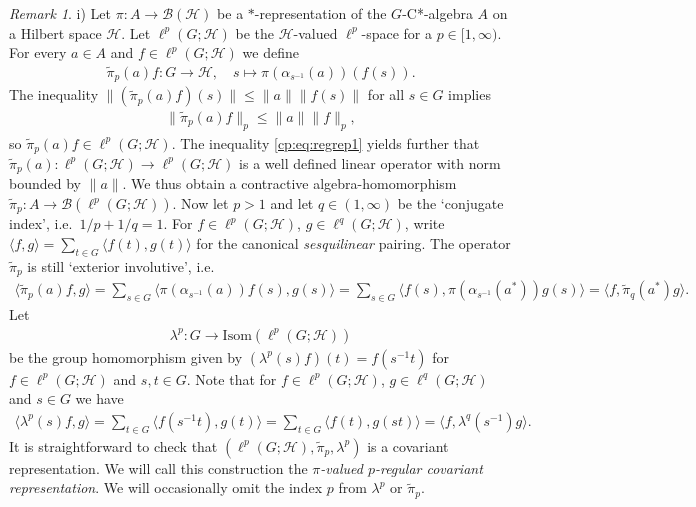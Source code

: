 \documentclass[12pt]{amsart}
\theoremstyle{definition}
\theoremstyle{remark}
\newtheorem{rem}[thm]{Remark}
\numberwithin{equation}{section}
\newcommand{\la}{\langle}
\newcommand{\ra}{\rangle}
\begin{document}
\begin{rem}
	i) Let $\pi\colon A \to \mathcal{B}(\mathcal{H})$ be a $*$-representation of the $G$-C*-algebra $A$
	on a Hilbert space $\mathcal{H}$.
	Let $\ell^p(G;\mathcal{H})$ be the  $\mathcal{H}$-valued $\ell^p$-space for a
	$p\in [1,\infty)$.
	For every $a\in A$ and $f\in \ell^p(G;\mathcal{H})$ we define
	\begin{align*}
		\widetilde{\pi}_p(a)f\colon G \to \mathcal{H},\quad s\mapsto \pi(\alpha_{s^{-1}}(a))(f(s)).
	\end{align*}
	The inequality $\| (\widetilde{\pi}_p(a)f)(s) \| \leq \| a\| \|f(s)\|$ for all $s\in G$ implies
	\begin{align}\label{cp:eq:regrep1}
		\|\widetilde{\pi}_p(a)f \|_p \leq \|a\| \|f\|_p,
	\end{align}
	so $\widetilde{\pi}_p(a)f\in \ell^p(G;\mathcal{H})$. The inequality \eqref{cp:eq:regrep1}
	yields further  that
	$\widetilde{\pi}_p(a)\colon \ell^p(G; \mathcal{H})\to \ell^p(G;\mathcal{H})$ is
	a well defined linear operator with norm bounded by $\|a\|$. We thus obtain a contractive
	algebra-homomorphism $\widetilde{\pi}_p\colon A \to \mathcal{B}(\ell^p(G;\mathcal{H}))$.
	Now let $p>1$ and let $q \in (1,\infty)$ be the `conjugate index', i.e.~$1/p+1/q=1$. For $f \in \ell^p(G;\mathcal{H})$, $g\in \ell^q(G;\mathcal{H})$, write $\la f,g\ra = \sum_{t\in G} \la f(t), g(t)\ra $ for the canonical \emph{sesquilinear} pairing. The operator $\widetilde{\pi}_p$ is still `exterior involutive', i.e.
	\begin{align}\label{cp:eq:exinv}
		\langle \widetilde{\pi}_p(a)f,g \rangle = \sum_{s\in G} \langle \pi(\alpha_{s^{-1}}(a))f(s),g(s) \rangle
		 = \sum_{s\in G} \langle f(s), \pi(\alpha_{s^{-1}}(a^*))g(s) \rangle
		= \langle f, \widetilde{\pi}_q(a^*)g \rangle.
	\end{align}
	Let
	\begin{align*}
		\lambda^p \colon G \to \mbox{Isom}(\ell^p(G;\mathcal{H}))
	\end{align*}
	be the group homomorphism given by $(\lambda^p(s)f)(t) = f(s^{-1}t)$ for $f\in \ell^p(G;\mathcal{H})$ and $s,t\in G$.
	Note that for $f\in \ell^p(G;\mathcal{H})$, $g\in \ell^q(G; \mathcal{H})$ and $s \in G$ we have
	\begin{align}\label{cp:eq:regrepinv}
		\langle \lambda^p(s)f,g\rangle = \sum_{t\in G} \langle f(s^{-1}t),g(t) \rangle
		= \sum_{t\in G} \langle f(t) ,g(st)\rangle  = \langle f, \lambda^q(s^{-1}) g \rangle.
	\end{align}
It is straightforward to check that $(\ell^p(G;\mathcal{H}),\widetilde{\pi}_p,
	\lambda^p)$ is a covariant representation. We will call this construction the
	\emph{$\pi$-valued $p$-regular covariant representation}. We will occasionally omit the index $p$ from $\lambda^p$ or $\widetilde{\pi}_p$.
	

\end{rem}
\end{document}
